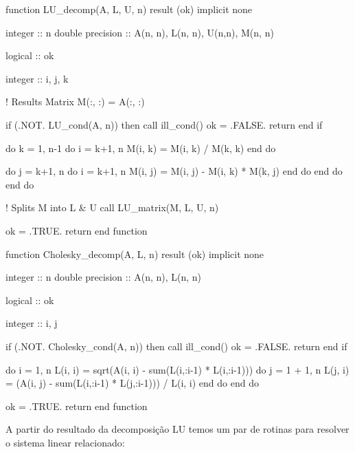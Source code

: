 \documentclass{homework}
\begin{document}
	\begin{fortran}
	function LU_decomp(A, L, U, n) result (ok)
		implicit none
		
		integer :: n
		double precision :: A(n, n), L(n, n), U(n,n), M(n, n)
		
		logical :: ok
		
		integer :: i, j, k
		
	!   Results Matrix
		M(:, :) = A(:, :)
		
		if (.NOT. LU_cond(A, n)) then
			call ill_cond()
			ok = .FALSE.
			return
		end if
		
		do k = 1, n-1
			do i = k+1, n
				M(i, k) = M(i, k) / M(k, k)
			end do
			
			do j = k+1, n
				do i = k+1, n
					M(i, j) = M(i, j) - M(i, k) * M(k, j)
				end do
			end do
		end do
		
	!   Splits M into L & U
		call LU_matrix(M, L, U, n)
		
		ok = .TRUE.
		return
	end function
	

	function Cholesky_decomp(A, L, n) result (ok)
		implicit none
		
		integer :: n
		double precision :: A(n, n), L(n, n)
		
		logical :: ok
		
		integer :: i, j
		
		if (.NOT. Cholesky_cond(A, n)) then
			call ill_cond()
			ok = .FALSE.
			return
		end if
		
		do i = 1, n
			L(i, i) = sqrt(A(i, i) - sum(L(i,:i-1) * L(i,:i-1)))
			do j = 1 + 1, n
				L(j, i) = (A(i, j) - sum(L(i,:i-1) * L(j,:i-1))) / L(i, i)
			end do
		end do
		
		ok = .TRUE.
		return
	end function
	\end{fortran}

	\subsubquest[Resolução de um sistema $\vec{A} \vec{x} = \vec{b}$]
	
	A partir do resultado da decomposição LU temos um par de rotinas para resolver o sistema linear relacionado:
	
\end{document}
